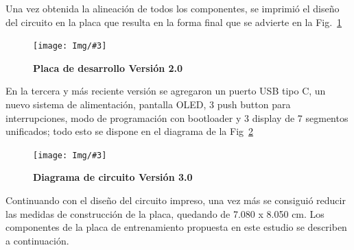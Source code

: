 \documentclass[times, 10pt,twocolumn]{article}
\newcommand{\Img}[5]{
   \begin{figure}[H]
   	   \centering
       \texttt{[image: Img/\#3]}
       \caption{ \centering \textbf{\small #4}}
       \label{#5}
   
       \end{figure}
   }
\begin{document}
Una vez obtenida la alineación de todos los componentes, se imprimió el diseño del circuito en la placa que resulta en la forma final que se advierte en la Fig.~\ref{fig:8}
\Img{8.5cm}{8.5cm}{segunda_version_final}{Placa de desarrollo Versión 2.0}{fig:8}


\vspace{-0.1cm}
En la tercera y más reciente versión se agregaron un puerto USB tipo C, un nuevo sistema de alimentación, pantalla OLED, 3 push button para interrupciones, modo de programación con bootloader y 3 display de 7 segmentos unificados; todo esto se dispone en el diagrama de la Fig~\ref{fig:9}
\Img{8.5cm}{7.0cm}{Tercera_Version}{Diagrama de circuito Versión 3.0}{fig:9}

Continuando con el diseño del circuito impreso, una vez más se consiguió reducir las medidas de
construcción de la placa, quedando de 7.080 x 8.050 cm. Los componentes de la placa de entrenamiento propuesta en este estudio se describen a continuación.
\end{document}
